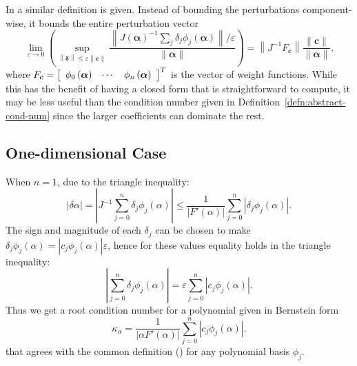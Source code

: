 \documentclass[3p, authoryear, square]{elsarticle}
\theoremstyle{definition}
\newcommand{\eps}{\varepsilon}
\begin{document}
In \cite[Chapter~25, Section 25.4]{Higham2002} a similar definition is
given. Instead of bounding the perturbations component-wise, it bounds
the entire perturbation vector
\begin{equation}
  \lim_{\eps \to 0} \left(\sup_{\left \lVert \bm{\delta} \right \rVert \leq
  \eps \left \lVert \bm{c} \right \rVert} \frac{\left \lVert
  J\left(\bm{\alpha}\right)^{-1} \sum_j \delta_j
  \phi_j\left(\bm{\alpha}\right) \right \rVert / \eps}{
  \left \lVert \bm{\alpha} \right \rVert}\right) =
  \left \lVert J^{-1} F_{\bm{c}} \right \rVert \frac{\left \lVert \bm{c}
  \right \rVert}{\left \lVert \bm{\alpha} \right \rVert}.
\end{equation}
where \(F_{\bm{c}} = \left[\begin{array}{c c c}
\phi_0\left(\bm{\alpha}\right) & \cdots & \phi_n\left(\bm{\alpha}\right)
\end{array}\right]^T\) is the vector of weight functions.
While this has the benefit of having a closed form that is straightforward
to compute, it may be less useful than the condition number given in
Definition~\ref{defn:abstract-cond-num} since the larger coefficients
can dominate the rest.

\subsection{One-dimensional Case}

When \(n = 1\), due to the triangle inequality:
\begin{equation}\label{eq:tri-ineq}
\left|\delta \alpha\right| = \left|J^{-1} \sum_{j = 0}^n
  \delta_j \phi_j(\alpha)\right| \leq \frac{1}{\left|F'(\alpha)\right|}
  \sum_{j = 0}^n \left|\delta_j \phi_j(\alpha)\right|.
\end{equation}
The sign and magnitude of each \(\delta_j\) can be chosen to make
\(\delta_j \phi_j(\alpha) = \left|c_j \phi_j(\alpha)\right| \eps\),
hence for these values equality holds in the triangle inequality:
\begin{equation}
\left|\sum_{j = 0}^n \delta_j \phi_j(\alpha)\right| =
\eps \sum_{j = 0}^n \left|c_j \phi_j(\alpha)\right|.
\end{equation}
Thus we get a root condition number for a polynomial given in Bernstein form
\begin{equation}
\kappa_{\alpha} =
  \frac{1}{\left|\alpha F'(\alpha)\right|} \sum_{j = 0}^n \left|
  c_j \phi_j(\alpha)\right|.
\end{equation}
that agrees with the common definition
(\cite[Equation~12.33]{Farouki2008}) for any polynomial basis
\(\phi_j\).
\end{document}
